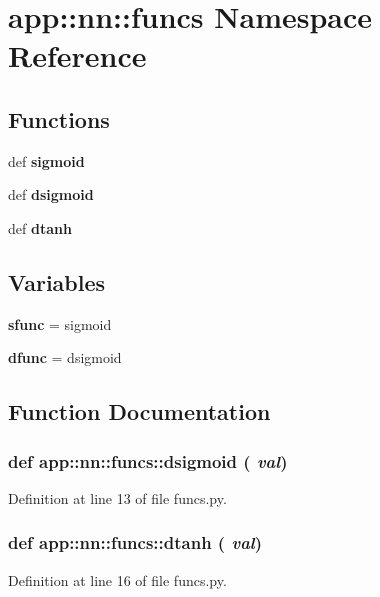 \section{app::nn::funcs Namespace Reference}
\label{namespaceapp_1_1nn_1_1funcs}


\subsection*{Functions}
\begin{CompactItemize}
\item 
def {\bf sigmoid}
\item 
def {\bf dsigmoid}
\item 
def {\bf dtanh}
\end{CompactItemize}
\subsection*{Variables}
\begin{CompactItemize}
\item 
{\bf sfunc} = sigmoid
\item 
{\bf dfunc} = dsigmoid
\end{CompactItemize}


\subsection{Function Documentation}
\subsubsection{\setlength{\rightskip}{0pt plus 5cm}def app::nn::funcs::dsigmoid ( {\em val})}\label{namespaceapp_1_1nn_1_1funcs_68da28b279380ab55ba9742376351e21}




Definition at line 13 of file funcs.py.
\subsubsection{\setlength{\rightskip}{0pt plus 5cm}def app::nn::funcs::dtanh ( {\em val})}\label{namespaceapp_1_1nn_1_1funcs_ee980e515faa6c52c5ff6c3b6c146d3c}




Definition at line 16 of file funcs.py.
